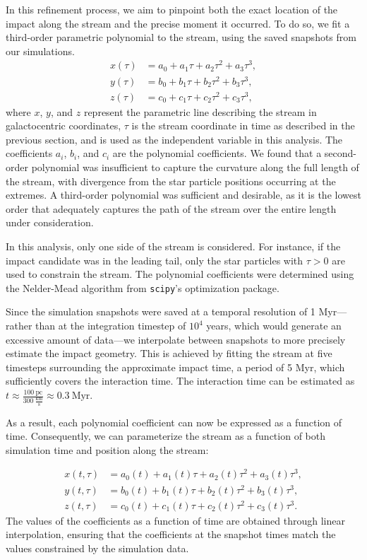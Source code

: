 \documentclass[draft]{aa}
\begin{document}
    In this refinement process, we aim to pinpoint both the exact location of the impact along the stream and the precise moment it occurred. To do so, we fit a third-order parametric polynomial to the stream, using the saved snapshots from our simulations.
    \begin{align}
      x(\tau) &= a_0 + a_1 \tau + a_2 \tau^2 + a_3 \tau^3, \\ 
      y(\tau) &= b_0 + b_1 \tau + b_2 \tau^2 + b_3 \tau^3, \\
      z(\tau) &= c_0 + c_1 \tau + c_2 \tau^2 + c_3 \tau^3,
      \end{align}
    where $x$, $y$, and $z$ represent the parametric line describing the stream in galactocentric coordinates, $\tau$ is the stream coordinate in time as described in the previous section, and is used as the independent variable in this analysis. The coefficients $a_i$, $b_i$, and $c_i$ are the polynomial coefficients. We found that a second-order polynomial was insufficient to capture the curvature along the full length of the stream, with divergence from the star particle positions occurring at the extremes. A third-order polynomial was sufficient and desirable, as it is the lowest order that adequately captures the path of the stream over the entire length under consideration.

    In this analysis, only one side of the stream is considered. For instance, if the impact candidate was in the leading tail, only the star particles with $\tau > 0$ are used to constrain the stream. The polynomial coefficients were determined using the Nelder-Mead algorithm from \texttt{scipy}'s optimization package.

    Since the simulation snapshots were saved at a temporal resolution of 1 Myr—rather than at the integration timestep of $10^4$ years, which would generate an excessive amount of data—we interpolate between snapshots to more precisely estimate the impact geometry. This is achieved by fitting the stream at five timesteps surrounding the approximate impact time, a period of 5 Myr, which sufficiently covers the interaction time. The interaction time can be estimated as $t \approx \frac{100~\text{pc}}{300~\frac{\text{km}}{\text{s}}} \approx 0.3~\text{Myr}$.

    As a result, each polynomial coefficient can now be expressed as a function of time. Consequently, we can parameterize the stream as a function of both simulation time and position along the stream:

    \begin{align}
      x(t,\tau) &= a_0(t) + a_1(t)\tau + a_2(t) \tau^2 + a_3(t)\tau^3, \\ 
      y(t,\tau) &= b_0(t) + b_1(t)\tau + b_2(t) \tau^2 + b_3(t)\tau^3, \\
      z(t,\tau) &= c_0(t) + c_1(t)\tau + c_2(t) \tau^2 + c_3(t)\tau^3.
      \end{align}
    The values of the coefficients as a function of time are obtained through linear interpolation, ensuring that the coefficients at the snapshot times match the values constrained by the simulation data.
\end{document}
